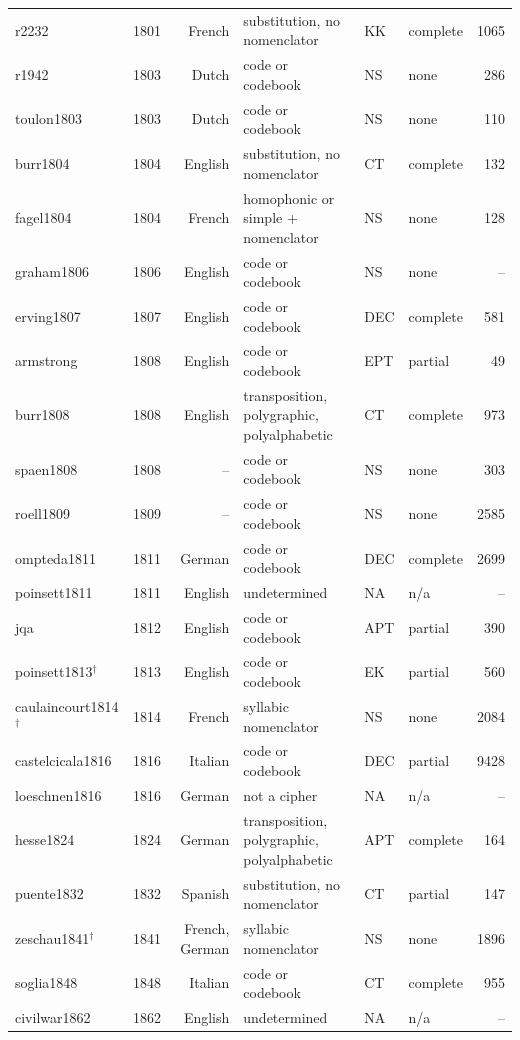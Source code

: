 {\begin{longtable}{@{}llrlllr@{}}
r2232 & 1801 & French & substitution, no nomenclator & KK & complete & 1065 \\
r1942 & 1803 & Dutch & code or codebook & NS & none & 286 \\
toulon1803 & 1803 & Dutch & code or codebook & NS & none & 110 \\
burr1804 & 1804 & English & substitution, no nomenclator & CT & complete & 132 \\
fagel1804 & 1804 & French & homophonic or simple + nomenclator & NS & none & 128 \\
graham1806 & 1806 & English & code or codebook & NS & none & -- \\
erving1807 & 1807 & English & code or codebook & DEC & complete & 581 \\
armstrong & 1808 & English & code or codebook & EPT & partial & 49 \\
burr1808 & 1808 & English & transposition, polygraphic, polyalphabetic & CT & complete & 973 \\
spaen1808 & 1808 & -- & code or codebook & NS & none & 303 \\
roell1809 & 1809 & -- & code or codebook & NS & none & 2585 \\
ompteda1811 & 1811 & German & code or codebook & DEC & complete & 2699 \\
poinsett1811 & 1811 & English & undetermined & NA & n/a & -- \\
jqa & 1812 & English & code or codebook & APT & partial & 390 \\
poinsett1813$^\dagger$ & 1813 & English & code or codebook & EK & partial & 560 \\
caulaincourt1814$^\dagger$ & 1814 & French & syllabic nomenclator & NS & none & 2084 \\
castelcicala1816 & 1816 & Italian & code or codebook & DEC & partial & 9428 \\
loeschnen1816 & 1816 & German & not a cipher & NA & n/a & -- \\
hesse1824 & 1824 & German & transposition, polygraphic, polyalphabetic & APT & complete & 164 \\
puente1832 & 1832 & Spanish & substitution, no nomenclator & CT & partial & 147 \\
zeschau1841$^\dagger$ & 1841 & French, German & syllabic nomenclator & NS & none & 1896 \\
soglia1848 & 1848 & Italian & code or codebook & CT & complete & 955 \\
civilwar1862 & 1862 & English & undetermined & NA & n/a & -- \\

\end{longtable}}
